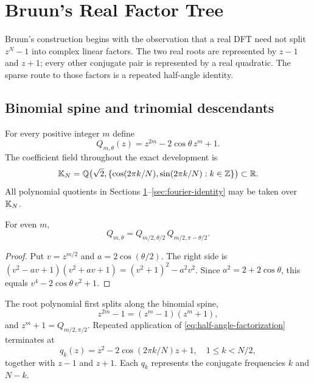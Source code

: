 \section{Bruun's Real Factor Tree}
\label{sec:bruun}

Bruun's construction begins with the observation that a real DFT need not split
$z^N-1$ into complex linear factors.  The two real roots are represented by
$z-1$ and $z+1$; every other conjugate pair is represented by a real quadratic.
The sparse route to those factors is a repeated half-angle identity.

\subsection{Binomial spine and trinomial descendants}

For every positive integer $m$ define
\begin{equation}
 Q_{m,\theta}(z)=z^{2m}-2\cos\theta\,z^m+1.
 \label{eq:Q-definition}
\end{equation}
The coefficient field throughout the exact development is
\begin{equation}
\mathbb{K}_N=\mathbb{Q}\bigl(\sqrt2,
\{\cos(2\pi k/N),\sin(2\pi k/N):k\in\mathbb{Z}\}\bigr)
 \subset\mathbb{R}.
 \label{eq:coefficient-field}
\end{equation}
All polynomial quotients in Sections \ref{sec:bruun}--\ref{sec:fourier-identity}
may be taken over $\mathbb{K}_N$.

\begin{lemma}
For even $m$,
\begin{equation}
 Q_{m,\theta}
 =Q_{m/2,\theta/2}\,Q_{m/2,\pi-\theta/2}.
 \label{eq:half-angle-factorization}
\end{equation}
\end{lemma}
\begin{proof}
Put $v=z^{m/2}$ and $a=2\cos(\theta/2)$.  The right side is
$(v^2-av+1)(v^2+av+1)=(v^2+1)^2-a^2v^2$.
Since $a^2=2+2\cos\theta$, this equals
$v^4-2\cos\theta\,v^2+1$.
\end{proof}

The root polynomial first splits along the binomial spine,
\begin{equation}
 z^{2m}-1=(z^m-1)(z^m+1),
 \label{eq:binomial-spine}
\end{equation}
and $z^m+1=Q_{m/2,\pi/2}$.  Repeated application of
\eqref{eq:half-angle-factorization} terminates at
\begin{equation}
 q_k(z)=z^2-2\cos(2\pi k/N)z+1,
 \quad 1\leq k<N/2,
 \label{eq:terminal-quadratic}
\end{equation}
together with $z-1$ and $z+1$.  Each $q_k$ represents the conjugate frequencies
$k$ and $N-k$.

